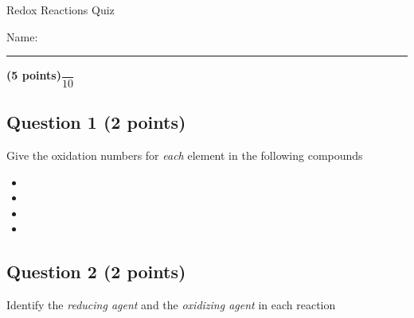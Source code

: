\documentclass[12pt, letterpaper]{memoir}
\begin{document}
	\begin{center}
		{\large Redox Reactions Quiz}
	\end{center}
	{\large Name: \rule[-1mm]{4in}{.1pt} {\bfseries (5 points)}\hspace{4em}$\dfrac{~}{10}$} 
	
	\subsection*{Question 1 (2 points)}
	Give the oxidation numbers for \emph{each} element in the following compounds
	
	\begin{itemize}
		\item \vspace{0.25em}	
		\item \vspace{2em}
		\item \vspace{2em}
		\item \vspace{2em}
	\end{itemize}
	
	\vspace{0.5em}
	\subsection*{Question 2 (2 points)}
	Identify the \emph{reducing agent} and the \emph{oxidizing agent} in each reaction
	
	
	\vspace{3.5em}

	\vspace{2.5em}
\end{document}
